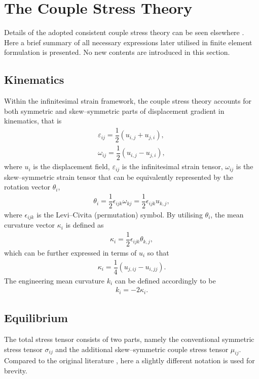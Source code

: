 \documentclass[3p,sort&compress,11pt,fleqn]{elsarticle}
\begin{document}
\section{The Couple Stress Theory}
Details of the adopted consistent couple stress theory can be seen elsewhere \citep{Hadjesfandiari2011}. Here a brief summary of all necessary expressions later utilised in finite element formulation is presented. No new contents are introduced in this section.
\subsection{Kinematics}
Within the infinitesimal strain framework, the couple stress theory \citep{Hadjesfandiari2011} accounts for both symmetric and skew--symmetric parts of displacement gradient in kinematics, that is
\begin{gather}\label{eq:varepsilon}
\varepsilon_{ij}=\dfrac{1}{2}\left(u_{i,j}+u_{j,i}\right),\\
\omega_{ij}=\dfrac{1}{2}\left(u_{i,j}-u_{j,i}\right),
\end{gather}
where $u_i$ is the displacement field, $\varepsilon_{ij}$ is the infinitesimal strain tensor, $\omega_{ij}$ is the skew--symmetric strain tensor that can be equivalently represented by the rotation vector $\theta_i$,
\begin{gather}\label{eq:theta}
\theta_i=\dfrac{1}{2}\epsilon_{ijk}\omega_{kj}=\dfrac{1}{2}\epsilon_{ijk}u_{k,j},
\end{gather}
where $\epsilon_{ijk}$ is the Levi--Civita (permutation) symbol. By utilising $\theta_i$, the mean curvature vector $\kappa_i$ is defined as
\begin{gather}\label{eq:kappa}
\kappa_i=\dfrac{1}{2}\epsilon_{ijk}\theta_{k,j},
\end{gather}
which can be further expressed in terms of $u_i$ so that
\begin{gather}
\kappa_i=\dfrac{1}{4}\left(u_{j,ij}-u_{i,jj}\right).
\end{gather}
The engineering mean curvature $k_i$ can be defined accordingly to be
\begin{gather}
k_i=-2\kappa_i.
\end{gather}
\subsection{Equilibrium}
The total stress tensor consists of two parts, namely the conventional symmetric stress tensor $\sigma_{ij}$ and the additional skew--symmetric couple stress tensor $\mu_{ij}$. Compared to the original literature \citep{Hadjesfandiari2011}, here a slightly different notation is used for brevity.
\end{document}
